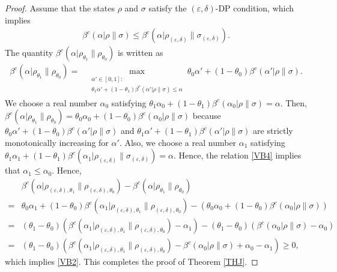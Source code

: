 \documentclass[10pt,a4paper]{amsart}
\newcommand{\eps}{\varepsilon}
\begin{document}
\begin{proof}
Assume that the states $\rho$ and $\sigma$ satisfy the $(\eps,\delta)$-DP condition, which implies
\begin{align}
\beta^c(\alpha| \rho\|\sigma) 
\le \beta^c(\alpha| \rho_{(\eps,\delta)}\|\sigma_{(\eps,\delta)})
\label{VB4}.
\end{align}
The quantity $\beta^c(\alpha| \rho_{\theta_1}\|\rho_{\theta_0}) $
is written as 
\begin{align}
\beta^c(\alpha| \rho_{\theta_1}\|\rho_{\theta_0}) 
=&    \max_{\substack{\alpha'\in [0,1]:\\
        \theta_1 \alpha'+(1-\theta_1) \beta^c(\alpha'| \rho\|\sigma)\le \alpha 
        }}\theta_0 \alpha'+(1-\theta_0) \beta^c(\alpha'| \rho\|\sigma)  .
  \end{align}
We choose a real number $\alpha_0$ satisfying
  $\theta_1 \alpha_0+(1-\theta_1) \beta^c(\alpha_0| \rho\|\sigma)= \alpha$.
  Then, 
$\beta^c(\alpha| \rho_{\theta_1}\|\rho_{\theta_0}) 
=\theta_0 \alpha_0+(1-\theta_0) \beta^c(\alpha_0| \rho\|\sigma)
$ because 
$\theta_0 \alpha'+(1-\theta_0) \beta^c(\alpha'| \rho\|\sigma) $
and
$\theta_1 \alpha'+(1-\theta_1) \beta^c(\alpha'| \rho\|\sigma)$
are strictly monotonically increasing for $\alpha'$.
Also, we choose a real number $\alpha_1$ satisfying
  $\theta_1 \alpha_1+(1-\theta_1) \beta^c( \alpha_1|
  \rho_{(\eps,\delta)}\|\sigma_{(\eps,\delta)})= \alpha$.
Hence, the relation \eqref{VB4} implies that
$\alpha_1\le \alpha_0$.
Hence, 
\begin{align*}
&\beta^c(\alpha| \rho_{(\eps,\delta),\theta_1}\|\rho_{(\eps,\delta),\theta_0})
-\beta^c(\alpha| \rho_{\theta_1}\|\rho_{\theta_0}) \\
=&\theta_0 \alpha_1+(1-\theta_0) \beta^c(\alpha_1| \rho_{(\eps,\delta),\theta_1}\|\rho_{(\eps,\delta),\theta_0})
-
(\theta_0 \alpha_0+(1-\theta_0) \beta^c(\alpha_0| \rho\|\sigma)) \\
=&
(\theta_1-\theta_0) (\beta^c(\alpha_1| \rho_{(\eps,\delta),\theta_1}\|\rho_{(\eps,\delta),\theta_0})
-\alpha_1)
-
(\theta_1-\theta_0) (\beta^c(\alpha_0| \rho\|\sigma)
-\alpha_0) \\
=&
(\theta_1-\theta_0) (
\beta^c(\alpha_1| \rho_{(\eps,\delta),\theta_1}\|\rho_{(\eps,\delta),\theta_0})
-\beta^c(\alpha_0| \rho\|\sigma)
+\alpha_0-\alpha_1) \ge 0,
\end{align*}
which implies \eqref{VB2}. This completes the proof of Theorem \ref{THJ}.
\end{proof}
\end{document}
